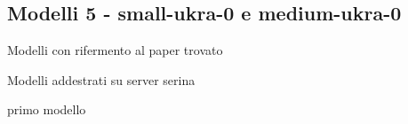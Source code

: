 \subsection*{Modelli 5 - small-ukra-0 e medium-ukra-0}


Modelli con rifermento al paper trovato

Modelli addestrati su server serina




primo modello